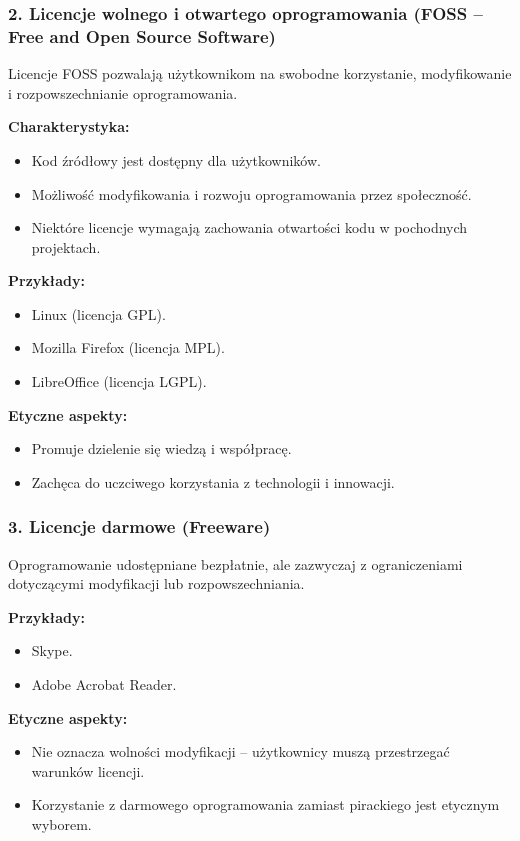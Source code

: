 \subsubsection{2. Licencje wolnego i otwartego oprogramowania (FOSS – Free and Open Source Software)}
Licencje FOSS pozwalają użytkownikom na swobodne korzystanie, modyfikowanie i rozpowszechnianie oprogramowania.

\textbf{Charakterystyka:}
\begin{itemize}
    \item Kod źródłowy jest dostępny dla użytkowników.
    \item Możliwość modyfikowania i rozwoju oprogramowania przez społeczność.
    \item Niektóre licencje wymagają zachowania otwartości kodu w pochodnych projektach.
\end{itemize}

\textbf{Przykłady:}
\begin{itemize}
    \item Linux (licencja GPL).
    \item Mozilla Firefox (licencja MPL).
    \item LibreOffice (licencja LGPL).
\end{itemize}

\textbf{Etyczne aspekty:}
\begin{itemize}
    \item Promuje dzielenie się wiedzą i współpracę.
    \item Zachęca do uczciwego korzystania z technologii i innowacji.
\end{itemize}

\subsubsection{3. Licencje darmowe (Freeware)}
Oprogramowanie udostępniane bezpłatnie, ale zazwyczaj z ograniczeniami dotyczącymi modyfikacji lub rozpowszechniania.

\textbf{Przykłady:}
\begin{itemize}
    \item Skype.
    \item Adobe Acrobat Reader.
\end{itemize}

\textbf{Etyczne aspekty:}
\begin{itemize}
    \item Nie oznacza wolności modyfikacji – użytkownicy muszą przestrzegać warunków licencji.
    \item Korzystanie z darmowego oprogramowania zamiast pirackiego jest etycznym wyborem.
\end{itemize}

